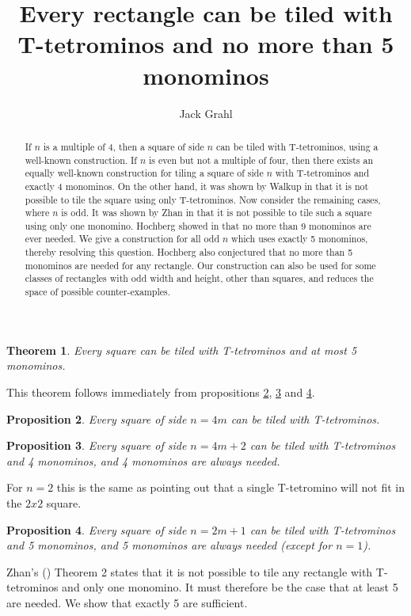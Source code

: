 \documentclass{article}
\title{Every rectangle can be tiled with T-tetrominos and no more than 5 monominos}
\author{Jack Grahl}
\theoremstyle{plain}
\newtheorem{theorem}{Theorem}[section]
\newtheorem{proposition}[theorem]{Proposition}
\begin{document}
\maketitle

\begin{abstract}
If $n$ is a multiple of 4, then a square of side $n$ can be tiled with T-tetrominos, using a well-known construction.
If $n$ is even but not a multiple of four, then there exists an equally well-known construction for tiling a square of side $n$ with T-tetrominos and exactly 4 monominos.
On the other hand, it was shown by Walkup in \cite{walkup} that it is not possible to tile the square using only T-tetrominos.
Now consider the remaining cases, where $n$ is odd.
It was shown by Zhan in \cite{zhan} that it is not possible to tile such a square using only one monomino.
Hochberg showed in \cite{hochberg} that no more than 9 monominos are ever needed.
We give a construction for all odd $n$ which uses exactly 5 monominos, thereby resolving this question.
Hochberg also conjectured that no more than 5 monominos are needed for any rectangle.
Our construction can also be used for some classes of rectangles with odd width and height, other than squares, and reduces the space of possible counter-examples.
\end{abstract}

\begin{theorem}
Every square can be tiled with T-tetrominos and at most 5 monominos.
\end{theorem}
This theorem follows immediately from propositions \ref{four}, \ref{even} and \ref{odd}.

\begin{proposition}\label{four}
Every square of side $n = 4m$ can be tiled with T-tetrominos.
\end{proposition}
\begin{proposition}\label{even}
Every square of side $n = 4m + 2$ can be tiled with T-tetrominos and 4 monominos, and 4 monominos are always needed.
\end{proposition}
For $n = 2$ this is the same as pointing out that a single T-tetromino will not fit in the $2x2$ square.

\begin{proposition}\label{odd}
Every square of side $n = 2m + 1$ can be tiled with T-tetrominos and 5 monominos, and 5 monominos are always needed (except for $n = 1$).
\end{proposition}
Zhan's (\cite{zhan}) Theorem 2 states that it is not possible to tile any rectangle with T-tetrominos and only one monomino. It must therefore be the case that at least 5 are needed. We show that exactly 5 are sufficient.
\end{document}
